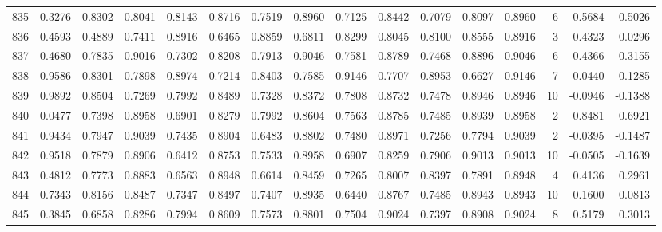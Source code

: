\begin{tabular}{lrrrrrrrrrrrrrrr}
835 &      0.3276 &  0.8302 &  0.8041 &  0.8143 &  0.8716 &  0.7519 &  0.8960 &  0.7125 &  0.8442 &  0.7079 &   0.8097 &     0.8960 &      6 &                    0.5684 &                     0.5026 \\
836 &      0.4593 &  0.4889 &  0.7411 &  0.8916 &  0.6465 &  0.8859 &  0.6811 &  0.8299 &  0.8045 &  0.8100 &   0.8555 &     0.8916 &      3 &                    0.4323 &                     0.0296 \\
837 &      0.4680 &  0.7835 &  0.9016 &  0.7302 &  0.8208 &  0.7913 &  0.9046 &  0.7581 &  0.8789 &  0.7468 &   0.8896 &     0.9046 &      6 &                    0.4366 &                     0.3155 \\
838 &      0.9586 &  0.8301 &  0.7898 &  0.8974 &  0.7214 &  0.8403 &  0.7585 &  0.9146 &  0.7707 &  0.8953 &   0.6627 &     0.9146 &      7 &                   -0.0440 &                    -0.1285 \\
839 &      0.9892 &  0.8504 &  0.7269 &  0.7992 &  0.8489 &  0.7328 &  0.8372 &  0.7808 &  0.8732 &  0.7478 &   0.8946 &     0.8946 &     10 &                   -0.0946 &                    -0.1388 \\
840 &      0.0477 &  0.7398 &  0.8958 &  0.6901 &  0.8279 &  0.7992 &  0.8604 &  0.7563 &  0.8785 &  0.7485 &   0.8939 &     0.8958 &      2 &                    0.8481 &                     0.6921 \\
841 &      0.9434 &  0.7947 &  0.9039 &  0.7435 &  0.8904 &  0.6483 &  0.8802 &  0.7480 &  0.8971 &  0.7256 &   0.7794 &     0.9039 &      2 &                   -0.0395 &                    -0.1487 \\
842 &      0.9518 &  0.7879 &  0.8906 &  0.6412 &  0.8753 &  0.7533 &  0.8958 &  0.6907 &  0.8259 &  0.7906 &   0.9013 &     0.9013 &     10 &                   -0.0505 &                    -0.1639 \\
843 &      0.4812 &  0.7773 &  0.8883 &  0.6563 &  0.8948 &  0.6614 &  0.8459 &  0.7265 &  0.8007 &  0.8397 &   0.7891 &     0.8948 &      4 &                    0.4136 &                     0.2961 \\
844 &      0.7343 &  0.8156 &  0.8487 &  0.7347 &  0.8497 &  0.7407 &  0.8935 &  0.6440 &  0.8767 &  0.7485 &   0.8943 &     0.8943 &     10 &                    0.1600 &                     0.0813 \\
845 &      0.3845 &  0.6858 &  0.8286 &  0.7994 &  0.8609 &  0.7573 &  0.8801 &  0.7504 &  0.9024 &  0.7397 &   0.8908 &     0.9024 &      8 &                    0.5179 &                     0.3013 \\

\end{tabular}
